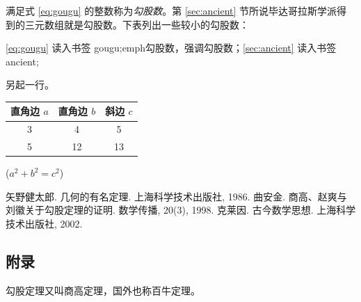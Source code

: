 \documentclass[UTF8]{ctexart}
\begin{document}
满足式 \eqref{eq:gougu} 的整数称为\emph{勾股数}。第 \ref{sec:ancient} 节所说毕达哥拉斯学派得到的三元数组就是勾股数。下表列出一些较小的勾股数：\par
\eqref{eq:gougu} 读入书签 gougu;emph{勾股数}，强调勾股数；\ref{sec:ancient} 读入书签 ancient;\par 另起一行。
 
\vspace{3mm} %
 
\begin{tabular} {|c|c|c|}\hline %
直角边 $a$ & 直角边 $b$ & 斜边 $c$ \\ \hline
3 & 4 & 5 \\ \hline
5 & 12 & 13 \\ \hline
\end{tabular} %
 
($a^2 + b^2 = c^2$) %
 
\begin{thebibliography}{99} %
 矢野健太郎. 几何的有名定理. 上海科学技术出版社, 1986. %
 曲安金. 商高、赵爽与刘徽关于勾股定理的证明. 数学传播, 20(3), 1998. %
 克莱因. 古今数学思想. 上海科学技术出版社, 2002. %
\end{thebibliography} %
 
 
\begin{appendix} %
\section{附录} 勾股定理又叫商高定理，国外也称百牛定理。 %
\end{appendix} %
 
\end{document}
